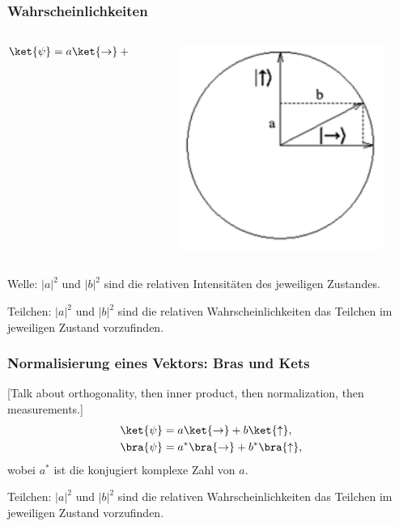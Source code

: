 \documentclass{beamer}
\begin{document}
\begin{frame}
\frametitle{Wahrscheinlichkeiten}
\begin{columns}
    \begin{column}{5cm}
        \begin{align*}
            \ket{\psi} &= a\ket{\to} + b\ket{\uparrow}
        \end{align*}
    \end{column}
    \begin{column}{5cm}
        \begin{figure}
            \centering
            \includegraphics[height=0.3\textheight]{fig24.png}
            \label{fig24}
        \end{figure}
    \end{column}
\end{columns}

\bigskip
Welle: $|a|^2$ und $|b|^2$ sind die relativen Intensit\"aten des jeweiligen Zustandes.

\bigskip
Teilchen: $|a|^2$ und $|b|^2$ sind die relativen Wahrscheinlichkeiten das Teilchen im jeweiligen Zustand vorzufinden.
\end{frame}

\begin{frame}
\frametitle{Normalisierung eines Vektors: Bras und Kets}
[Talk about orthogonality, then inner product, then normalization, then measurements.]
\begin{align*}
    \ket{\psi} &= a\ket{\to} + b\ket{\uparrow},
    \\
    \bra{\psi} &= a^*\bra{\to} + b^*\bra{\uparrow},
\end{align*}
wobei $a^*$ ist die konjugiert komplexe Zahl von $a$.

\bigskip
Teilchen: $|a|^2$ und $|b|^2$ sind die relativen Wahrscheinlichkeiten das Teilchen im jeweiligen Zustand vorzufinden.
\end{frame}
\end{document}
